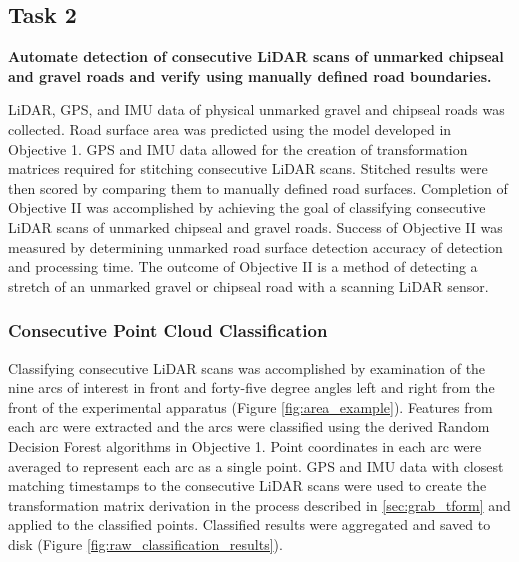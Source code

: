 \documentclass[numbered,pdftex]{ohio-etd}
\begin{document}
{{{{				
			} %

		
		} %
		
		\subsection{Task 2}\label{sec:Objective_2_Task_2}{
		
			{\textbf{Automate detection of consecutive LiDAR scans of unmarked chipseal and gravel roads and verify using manually defined road boundaries.} 
				
				{LiDAR, GPS, and IMU data of physical unmarked gravel and chipseal roads was collected. Road surface area was predicted using the model developed in Objective 1. GPS and IMU data allowed for the creation of transformation matrices required for stitching consecutive LiDAR scans. Stitched results were then scored by comparing them to manually defined road surfaces. Completion of Objective II was accomplished by achieving the goal of classifying consecutive LiDAR scans of unmarked chipseal and gravel roads. Success of Objective II was measured by determining unmarked road surface detection accuracy of detection and processing time. The outcome of Objective II is a method of detecting a stretch of an unmarked gravel or chipseal road with a scanning LiDAR sensor.}
			
			\subsubsection{Consecutive Point Cloud Classification}\label{sec:consecutive_point_cloud_classification}{
			
				{Classifying consecutive LiDAR scans was accomplished by examination of the nine arcs of interest in front and forty-five degree angles left and right from the front of the experimental apparatus (Figure \ref{fig:area_example}). Features from each arc were extracted and the arcs were classified using the derived Random Decision Forest algorithms in Objective 1. Point coordinates in each arc were averaged to represent each arc as a single point. GPS and IMU data with closest matching timestamps to the consecutive LiDAR scans were used to create the transformation matrix derivation in the process described in \ref{sec:grab_tform} and applied to the classified points. Classified results were aggregated and saved to disk (Figure \ref{fig:raw_classification_results}).}
				
}}}}}
\end{document}
